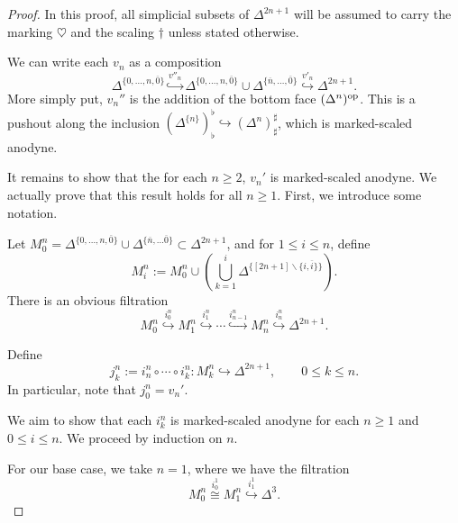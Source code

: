 \documentclass[main.tex]{subfiles}
\begin{document}
\begin{proof}
  In this proof, all simplicial subsets of $\Delta^{2n+1}$ will be assumed to carry the marking $\heartsuit$ and the scaling $\dagger$ unless stated otherwise.

  We can write each $v_{n}$ as a composition
  \begin{equation*}
    \Delta^{\{0, \ldots, n, \overline{0}\}} \overset{v''_{n}}{\hookrightarrow} \Delta^{\{0, \ldots, n, \overline{0}\}} \cup \Delta^{\{\overline{n}, \ldots, \overline{0}\}} \overset{v'_{n}}{\hookrightarrow} \Delta^{2n+1}.
  \end{equation*}
  More simply put, $v_{n}''$ is the addition of the bottom face $(\Delta^{n})^{\mathrm{op}}$. This is a pushout along the inclusion $(\Delta^{\{n\}})^{\flat}_{\flat} \hookrightarrow (\Delta^{n})^{\sharp}_{\sharp}$, which is marked-scaled anodyne.

  It remains to show that the for each $n \geq 2$, $v_{n}'$ is marked-scaled anodyne. We actually prove that this result holds for all $n \geq 1$. First, we introduce some notation.

  Let $M^{n}_{0} = \Delta^{\{0, \ldots, n, \overline{0}\}} \cup \Delta^{\{\overline{n}, \ldots \overline{0}\}} \subset \Delta^{2n+1}$, and for $1 \leq i \leq n$, define
  \begin{equation*}
    M^{n}_{i} := M^{n}_{0} \cup \left(\bigcup_{k = 1}^{i} \Delta^{\{[2n+1] \smallsetminus \{i, \overline{i}\}\}}\right).
  \end{equation*}
  There is an obvious filtration
  \begin{equation}
    \label{eq:filtration_by_adding_sides}
    M^{n}_{0} \overset{i^{n}_{0}}{\hookrightarrow} M^{n}_{1} \overset{i^{n}_{1}}{\hookrightarrow} \cdots \overset{i^{n}_{n-1}}{\hookrightarrow} M^{n}_{n} \overset{i^{n}_{n}}{\hookrightarrow} \Delta^{2n+1}.
  \end{equation}

  Define
  \begin{equation*}
    j^{n}_{k} := i^{n}_{n} \circ \cdots \circ i^{n}_{k}\colon M^{n}_{k} \hookrightarrow \Delta^{2n+1},\qquad 0 \leq k \leq n.
  \end{equation*}
  In particular, note that $j^{n}_{0} = v_{n}'$.

  We aim to show that each $i^{n}_{k}$ is marked-scaled anodyne for each $n \geq 1$ and $0 \leq i \leq n$. We proceed by induction on $n$.

  For our base case, we take $n=1$, where we have the filtration
  \begin{equation*}
    M^{n}_{0} \overset{i^{1}_{0}}{\cong} M^{n}_{1} \overset{i^{1}_{1}}{\hookrightarrow} \Delta^{3}.
  \end{equation*}


\end{proof}
\end{document}
